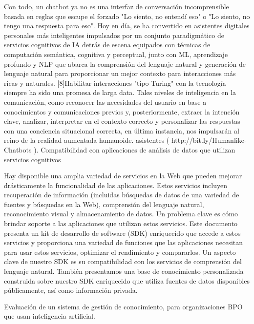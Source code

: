 Con todo, un chatbot ya no es una interfaz de conversación incomprensible basada en reglas que escupe el forzado "Lo siento, no entendí eso" o "Lo siento, no tengo una respuesta para eso". Hoy en día, se ha convertido en asistentes digitales personales más inteligentes impulsados por un conjunto paradigmático de servicios cognitivos de IA detrás de escena equipados con técnicas de computación semántica, cognitiva y perceptual, junto con ML, aprendizaje profundo y NLP que abarca la comprensión del lenguaje natural y generación de lenguaje natural para proporcionar un mejor contexto para interacciones más ricas y naturales. [8]Habilitar interacciones "tipo Turing" con la tecnología siempre ha sido una promesa de larga data. Tales niveles de inteligencia en la comunicación, como reconocer las necesidades del usuario en base a conocimientos y comunicaciones previos y, posteriormente, extraer la intención clave, analizar, interpretar en el contexto correcto y personalizar las respuestas con una conciencia situacional correcta, en última instancia, nos impulsarán al reino de la realidad aumentada humanoide. asistentes ( http://bit.ly/Humanlike-Chatbots ).
Compatibilidad con aplicaciones de análisis de datos que utilizan servicios cognitivos

Hay disponible una amplia variedad de servicios en la Web que pueden mejorar drásticamente la funcionalidad de las aplicaciones. Estos servicios incluyen recuperación de información (incluidas búsquedas de datos de una variedad de fuentes y búsquedas en la Web), comprensión del lenguaje natural, reconocimiento visual y almacenamiento de datos. Un problema clave es cómo brindar soporte a las aplicaciones que utilizan estos servicios. Este documento presenta un kit de desarrollo de software (SDK) enriquecido que accede a estos servicios y proporciona una variedad de funciones que las aplicaciones necesitan para usar estos servicios, optimizar el rendimiento y compararlos. Un aspecto clave de nuestro SDK es su compatibilidad con los servicios de comprensión del lenguaje natural. También presentamos una base de conocimiento personalizada construida sobre nuestro SDK enriquecido que utiliza fuentes de datos disponibles públicamente, así como información privada.
 
Evaluación de un sistema de gestión de conocimiento, para organizaciones BPO que usan inteligencia artificial.
 

